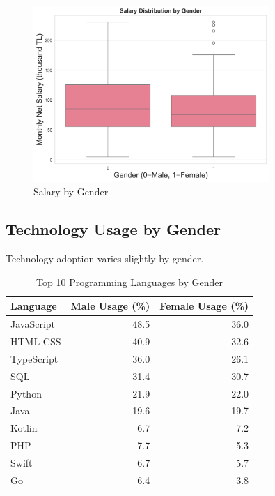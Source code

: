 \documentclass[12pt,a4paper]{article}
\begin{document}
\begin{figure}[H]
	\centering
	\includegraphics[width=0.8\textwidth]{figures/boxplot_gender.png}
	\caption{Salary by Gender}
\end{figure}

\subsection{Technology Usage by Gender}
Technology adoption varies slightly by gender.

\begin{table}[H]
	\centering
	\small
	\begin{tabular}{lrr}
		\toprule
		\textbf{Language} & \textbf{Male Usage (\%)} & \textbf{Female Usage (\%)} \\
		\midrule
		JavaScript        & 48.5                     & 36.0                       \\
		HTML CSS          & 40.9                     & 32.6                       \\
		TypeScript        & 36.0                     & 26.1                       \\
		SQL               & 31.4                     & 30.7                       \\
		Python            & 21.9                     & 22.0                       \\
		Java              & 19.6                     & 19.7                       \\
		Kotlin            & 6.7                      & 7.2                        \\
		PHP               & 7.7                      & 5.3                        \\
		Swift             & 6.7                      & 5.7                        \\
		Go                & 6.4                      & 3.8                        \\
		\bottomrule
	\end{tabular}
	\caption{Top 10 Programming Languages by Gender}
\end{table}
\end{document}
